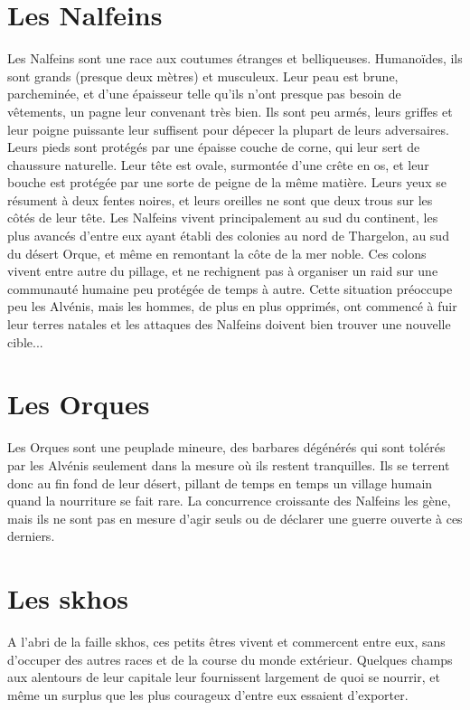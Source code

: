 \section{Les Nalfeins}
Les Nalfeins sont une race aux coutumes étranges et belliqueuses. Humanoïdes, ils sont grands (presque deux mètres) et musculeux. Leur peau est brune, parcheminée, et d'une épaisseur telle qu'ils n'ont presque pas besoin de vêtements, un pagne leur convenant très bien. Ils sont peu armés, leurs griffes et leur poigne puissante leur suffisent pour dépecer la plupart de leurs adversaires. Leurs pieds sont protégés par une épaisse couche de corne, qui leur sert de chaussure naturelle. Leur tête est ovale, surmontée d'une crête en os, et leur bouche est protégée par une sorte de peigne de la même matière. Leurs yeux se résument à deux fentes noires, et leurs oreilles ne sont que deux trous sur les côtés de leur tête. Les Nalfeins vivent principalement au sud du continent, les plus avancés d'entre eux ayant établi des colonies au nord de Thargelon, au sud du désert Orque, et même en remontant la côte de la mer noble. Ces colons vivent entre autre du pillage, et ne rechignent pas à organiser un raid sur une communauté humaine peu protégée de temps à autre. Cette situation préoccupe peu les Alvénis, mais les hommes, de plus en plus opprimés, ont commencé à fuir leur terres natales et les attaques des Nalfeins doivent bien trouver une nouvelle cible...

\section{Les Orques}
Les Orques sont une peuplade mineure, des barbares dégénérés qui sont tolérés par les Alvénis seulement dans la mesure où ils restent tranquilles. Ils se terrent donc au fin fond de leur désert, pillant de temps en temps un village humain quand la nourriture se fait rare. La concurrence croissante des Nalfeins les gène, mais ils ne sont pas en mesure d'agir seuls ou de déclarer une guerre ouverte à ces derniers.

\section{Les skhos}
A l'abri de la faille skhos, ces petits êtres vivent et commercent entre eux, sans d'occuper des autres races et de la course du monde extérieur. Quelques champs aux alentours de leur capitale leur fournissent largement de quoi se nourrir, et même un surplus que les plus courageux d'entre eux essaient d'exporter.

